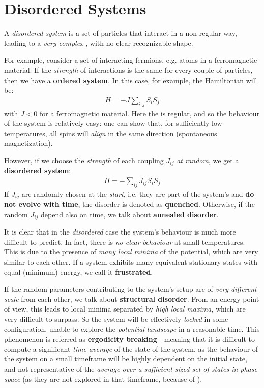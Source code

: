 \documentclass[../template.tex]{subfiles}
\begin{document}
\section{Disordered Systems}
A \textit{disordered system} is a set of particles that interact in a non-regular way, leading to a \textit{very complex} , with no clear recognizable shape.

For example, consider a set of interacting fermions, e.g. atoms in a ferromagnetic material. If the \textit{strength} of interactions is the same for every couple of particles, then we have a \textbf{ordered system}. In this case, for example, the Hamiltonian will be:
\begin{align*}
    H = -J \sum_{i,j} S_i S_j
\end{align*}   
with $J < 0$ for a ferromagnetic material. Here the  is regular, and so the behaviour of the system is relatively easy: one can show that, for sufficiently low temperatures, all spins will \textit{align} in the same direction (spontaneous magnetization).

However, if we choose the \textit{strength} of each coupling $J_{ij}$ \textit{at random}, we get a \textbf{disordered system}:
\begin{align*}
    H=-\sum_{ij} J_{ij} S_i S_j
\end{align*}  
If $J_{ij}$ are randomly chosen at the \textit{start}, i.e. they are part of the system's  and \textbf{do not evolve with time}, the disorder is denoted as \textbf{quenched}. Otherwise, if the random $J_{ij}$ depend also on time, we talk about \textbf{annealed disorder}.

It is clear that in the \textit{disordered} case the system's behaviour is much more difficult to predict. In fact, there is \textit{no clear behaviour} at small temperatures. This is due to the presence of \textit{many local minima} of the potential, which are very similar to each other. If a system exhibits many equivalent stationary states with equal (minimum) energy, we call it \textbf{frustrated}.

If the random parameters contributing to the system's setup are of \textit{very different scale} from each other, we talk about \textbf{structural disorder}. From an energy point of view, this leads to local minima separated by \textit{high local maxima}, which are very difficult to surpass. So the system will be effectively \textit{locked} in some configuration, unable to explore the \textit{potential landscape} in a reasonable time. This phenomenon is referred as \textbf{ergodicity breaking} - meaning that it is difficult to compute a significant \textit{time average} of the state of the system, as the behaviour of the system on a small timeframe will be highly dependent on the initial state, and not representative of the \textit{average over a sufficient sized set of states in phase-space} (as they are not explored in that timeframe, because of ).\\
\end{document}
